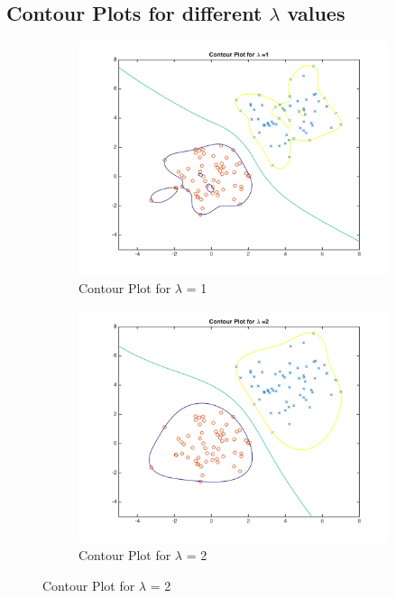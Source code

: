 \documentclass[english]{article}
\begin{document}
\subsection{Contour Plots for different $\lambda$ values}

\begin{figure}[!htbp] 
\begin{subfigure}{0.48\textwidth}
\includegraphics[width=\linewidth]{../plotLambda/plot_1}
\caption{Contour Plot for $\lambda$ = 1} 
\end{subfigure}\hspace*{\fill}
\begin{subfigure}{0.48\textwidth}
\includegraphics[width=\linewidth]{../plotLambda/plot_2}
\caption{Contour Plot for $\lambda$ = 2} \label{fig:b}
\end{subfigure}


\end{figure}
\end{document}
